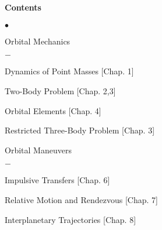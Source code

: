 \documentclass[10pt]{article}
\begin{document}
\paragraph*{Contents}
\begin{list}{$\bullet$}{\setlength{\itemsep}{-3pt}}
\item Orbital Mechanics\vspace*{-0.2cm}
    \begin{list}{$-$}{\setlength{\itemsep}{-3pt}}
    \item Dynamics of Point Masses [Chap. 1]
    \item Two-Body Problem [Chap. 2,3]
    \item Orbital Elements [Chap. 4]
    \item Restricted Three-Body Problem [Chap. 3]
    \end{list}
\item Orbital Maneuvers\vspace*{-0.2cm}
    \begin{list}{$-$}{\setlength{\itemsep}{-3pt}}
    \item Impulsive Transfers [Chap. 6]
    \item Relative Motion and Rendezvous [Chap. 7]
    \item Interplanetary Trajectories [Chap. 8]   
    \end{list}
\end{list}
\end{document}
